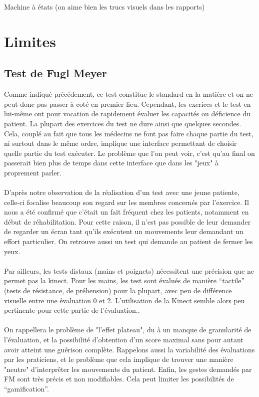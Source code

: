 \documentclass[french,12pt]{report}
\begin{document}
		Machine à états (on aime bien les trucs visuels dans les rapports)
		
		\section{Limites}%
			\subsection{Test de Fugl Meyer}
Comme indiqué précédement, ce test constitue le standard en la matière et on ne peut donc pas passer à coté en premier lieu.
Cependant, les exerices et le test en lui-même ont pour vocation de rapidement évaluer les capacités ou déficience
du patient. La plupart des exercices du test ne dure ainsi que quelques secondes. Cela, couplé au fait que tous les 
médecins ne font pas faire chaque partie du test, ni surtout dans le même ordre, implique une interface permettant de 
choisir quelle partie du test exécuter. Le problème que l’on peut voir, c'est qu'au final on passerait 
bien plus de temps dans cette interface que dans les "jeux" à proprement parler.

\paragraph{}
D'après notre observation de la réalisation d'un test avec une jeune patiente, celle-ci focalise 
beaucoup son regard sur les membres concernés par l'exercice. Il nous a été confirmé que c'était un fait fréquent
chez les patients, notamment en début de réhabilitation. Pour cette raison, il n'est pas possible de leur
demander de regarder un écran tant qu'ils exécutent un mouvements leur demandant un effort particulier.
On retrouve aussi un test qui demande au patient de fermer les yeux.

\paragraph{}
Par ailleurs, les tests distaux (mains et poignets) nécessitent une précision que ne permet pas la kinect.
Pour les mains, les test sont évalués de manière “tactile” (tests de résistance, de préhension) pour la plupart, 
avec peu de différence visuelle entre une évaluation 0 et 2. L’utilisation de la Kinect semble alors 
peu pertinente pour cette partie de l’évaluation..

\paragraph{}
On rappellera le problème de "l'effet plateau", du à un manque de granularité de l'évaluation, et la possibilité
d'obtention d'un score maximal sans pour autant avoir atteint une guérison complète. Rappelons aussi la variabilité
des évaluations par les praticiens, et le problème que cela implique de trouver une manière "neutre" d'interprêter
les mouvements du patient.
Enfin, les gestes demandés par FM sont très précis et non modifiables. Cela peut limiter les possibilités de “gamification”.
		
\end{document}
